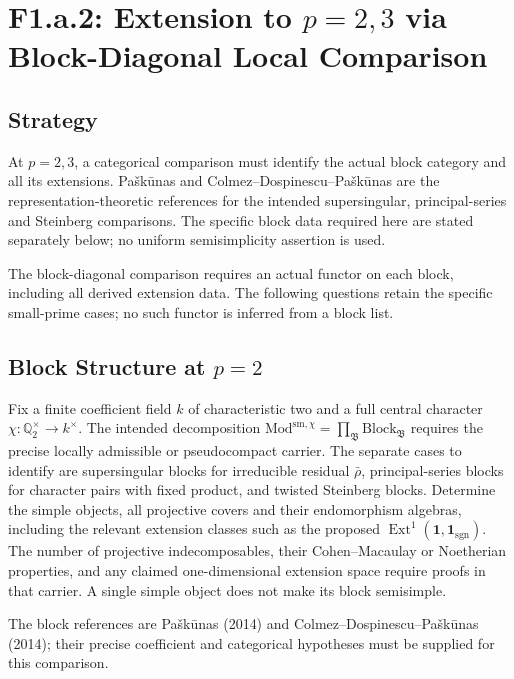\section{F1.a.2: Extension to \(p=2,3\) via Block-Diagonal Local Comparison}
\label{v4-arith:w5-e:f1a2}

\subsection{Strategy}

At $p=2,3$, a categorical comparison must identify the actual block
category and all its extensions. Pa\v{s}k\=unas and
Colmez--Dospinescu--Pa\v{s}k\=unas are the representation-theoretic
references for the intended supersingular, principal-series and
Steinberg comparisons. The specific block data required here are
stated separately below; no uniform semisimplicity assertion is used.

The block-diagonal comparison requires an actual functor on each block, including all derived extension data. The following questions retain the specific small-prime cases; no such functor is inferred from a block list.

\subsection{Block Structure at \(p=2\)}

\begin{conjecture}[the small-prime block data at $p=2$]
\label{v4-arith:w5-e:thm:Paskunas-p2}
Fix a finite coefficient field $k$ of characteristic two and a full
central character $\chi:\mathbb Q_2^\times\to k^\times$.
The intended decomposition
$\mathrm{Mod}^{\mathrm{sm},\chi}=\prod_{\mathfrak B}\mathrm{Block}_{\mathfrak B}$
requires the precise locally admissible or pseudocompact carrier.
The separate cases to identify are supersingular blocks for irreducible
residual $\bar\rho$, principal-series blocks for character pairs with
fixed product, and twisted Steinberg blocks. Determine the simple
objects, all projective covers and their endomorphism algebras,
including the relevant extension classes such as the proposed
$\operatorname{Ext}^1(\mathbf1,\mathbf1_{\mathrm{sgn}})$.
The number of projective indecomposables, their Cohen--Macaulay or
Noetherian properties, and any claimed one-dimensional extension
space require proofs in that carrier. A single simple object does not
make its block semisimple.
\end{conjecture}
The block references are Pa\v{s}k\=unas (2014) and Colmez--Dospinescu--Pa\v{s}k\=unas (2014); their precise coefficient and categorical hypotheses must be supplied for this comparison.

